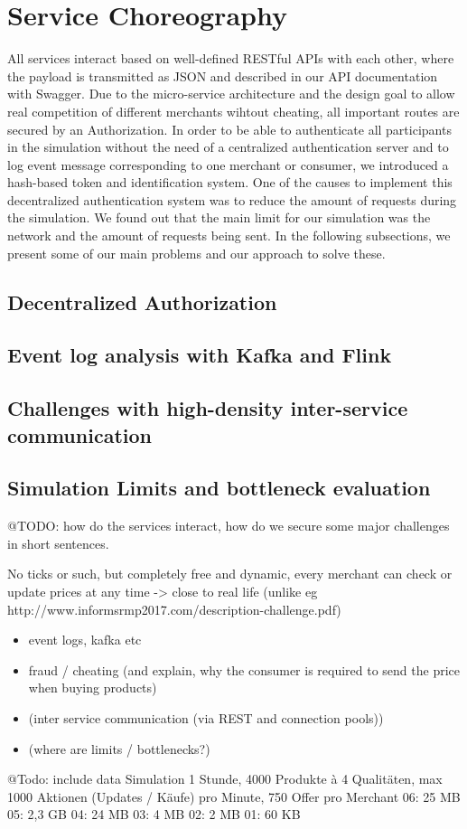 \section{Service Choreography}
\label{sec:Choreography}
%

All services interact based on well-defined RESTful APIs with each other, where the payload is transmitted as JSON and described in our API documentation with Swagger. Due to the micro-service architecture and the design goal to allow real competition of different merchants wihtout cheating, all important routes are secured by an Authorization. In order to be able to authenticate all participants in the simulation without the need of a centralized authentication server and to log event message corresponding to one merchant or consumer, we introduced a hash-based token and identification system. One of the causes to implement this decentralized authentication system was to reduce the amount of requests during the simulation. We found out that the main limit for our simulation was the network and the amount of requests being sent. In the following subsections, we present some of our main problems and our approach to solve these.

\subsection{Decentralized Authorization}
\subsection{Event log analysis with Kafka and Flink}
\subsection{Challenges with high-density inter-service communication}
\subsection{Simulation Limits and bottleneck evaluation}

@TODO: how do the services interact, how do we secure some major challenges in short sentences.

No ticks or such, but completely free and dynamic, every merchant can check or update prices at any time -> close to real life (unlike eg http://www.informsrmp2017.com/description-challenge.pdf)

\begin{itemize}
\item event logs, kafka etc
\item fraud / cheating (and explain, why the consumer is required to send the price when buying products)
\item (inter service communication (via REST and connection pools))
\item (where are limits / bottlenecks?)
\end{itemize} 

@Todo: include data
Simulation 1 Stunde, 4000 Produkte à 4 Qualitäten, max 1000 Aktionen (Updates / Käufe) pro Minute, 750 Offer pro Merchant
06: 25 MB
05: 2,3 GB
04: 24 MB
03: 4 MB
02: 2 MB
01: 60 KB